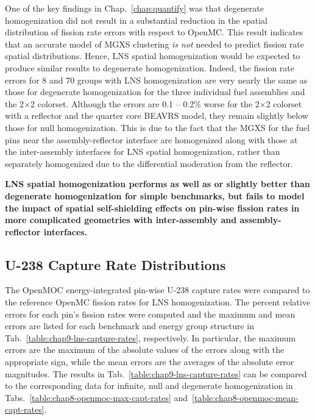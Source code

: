 One of the key findings in Chap.~\ref{chap:quantify} was that degenerate homogenization did not result in a substantial reduction in the spatial distribution of fission rate errors with respect to OpenMC. This result indicates that an accurate model of \ac{MGXS} clustering \textit{is not} needed to predict fission rate spatial distributions. Hence, \ac{LNS} spatial homogenization would be expected to produce similar results to degenerate homogenization. Indeed, the fission rate errors for 8 and 70 groups with \ac{LNS} homogenization are very nearly the same as those for degenerate homogenization for the three individual fuel assemblies and the 2$\times$2 colorset. Although the errors are 0.1 -- 0.2\% worse for the 2$\times$2 colorset with a reflector and the quarter core \ac{BEAVRS} model, they remain slightly below those for null homogenization. This is due to the fact that the \ac{MGXS} for the fuel pins near the assembly-reflector interface are homogenized along with those at the inter-assembly interfaces for \ac{LNS} spatial homogenization, rather than separately homogenized due to the differential moderation from the reflector.

\begin{emphbox}
\textbf{\ac{LNS} spatial homogenization performs as well as or slightly better than degenerate homogenization for simple benchmarks, but fails to model the impact of spatial self-shielding effects on pin-wise fission rates in more complicated geometries with inter-assembly and assembly-reflector interfaces.}
\end{emphbox}

\subsection{U-238 Capture Rate Distributions}
\label{subsec:chap9-lns-capt-rates}

The OpenMOC energy-integrated pin-wise U-238 capture rates were compared to the reference OpenMC fission rates for \ac{LNS} homogenization. The percent relative errors for each pin's fission rates were computed and the maximum and mean errors are listed for each benchmark and energy group structure in Tab.~\ref{table:chap9-lns-capture-rates}, respectively. In particular, the maximum errors are the maximum of the absolute values of the errors along with the appropriate sign, while the mean errors are the averages of the absolute error magnitudes. The results in Tab.~\ref{table:chap9-lns-capture-rates} can be compared to the corresponding data for infinite, null and degenerate homogenization in Tabs.~\ref{table:chap8-openmoc-max-capt-rates} and~\ref{table:chap8-openmoc-mean-capt-rates}.


